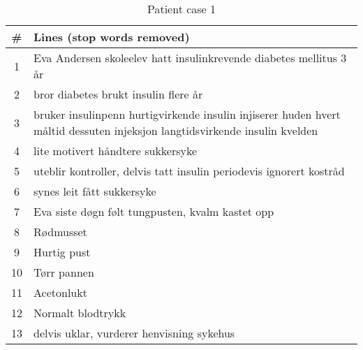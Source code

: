 \begin{table}[htbp] \footnotesize \center
\caption{Patient case 1\label{tab:pcase1}}
\begin{tabularx}{\textwidth}{c X}
    \toprule
    \# & Lines (stop words removed) \\
    \midrule
	1 & Eva Andersen skoleelev hatt insulinkrevende diabetes mellitus 3 år \\
	2 & bror diabetes brukt insulin flere år \\
	3 & bruker insulinpenn hurtigvirkende insulin injiserer huden hvert måltid dessuten injeksjon langtidsvirkende insulin kvelden \\
	4 & lite motivert håndtere sukkersyke \\
	5 & uteblir kontroller, delvis tatt insulin periodevis ignorert kostråd \\
	6 & synes leit fått sukkersyke \\
	7 & Eva siste døgn følt tungpusten, kvalm kastet opp \\
	8 & Rødmusset \\
	9 & Hurtig pust \\
	10 & Tørr pannen \\
	11 & Acetonlukt \\
	12 & Normalt blodtrykk \\
	13 & delvis uklar, vurderer henvisning sykehus \\
	\bottomrule
\end{tabularx}
\end{table}



